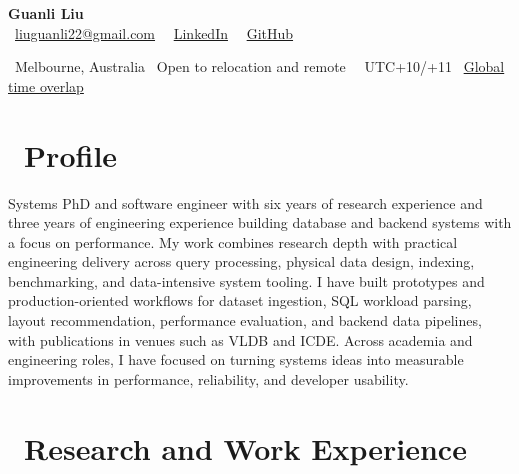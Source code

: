 \documentclass{resume}
\begin{document}

{\LARGE \textbf{Guanli Liu}}\\[-0.2em]
\faEnvelope\ \href{mailto:liuguanli22@gmail.com}{liuguanli22@gmail.com} 
\textperiodcentered\ 
\faLinkedin\ \href{https://www.linkedin.com/in/guanli-liu-11353058/}{LinkedIn} \textperiodcentered\ 
\faGithub\ \href{https://github.com/Liuguanli}{GitHub}

\faMapMarker\ Melbourne, Australia \textperiodcentered\ Open to relocation and remote \textperiodcentered\ 
\faClockO\  UTC+10/+11 \textperiodcentered\ 
\href{https://www.worldtimebuddy.com/?lid=5808079,5128581,5809844,1816670,2158177&h=2158177&hf=1}{Global time overlap \faExternalLink}
\vspace{0.4em}



\section{\faUser\ \textbf{Profile}}
Systems PhD and software engineer with six years of research experience and three years of engineering experience building database and backend systems with a focus on performance. My work combines research depth with practical engineering delivery across query processing, physical data design, indexing, benchmarking, and data-intensive system tooling. I have built prototypes and production-oriented workflows for dataset ingestion, SQL workload parsing, layout recommendation, performance evaluation, and backend data pipelines, with publications in venues such as VLDB and ICDE. Across academia and engineering roles, I have focused on turning systems ideas into measurable improvements in performance, reliability, and developer usability.



\section{\faUsers\ \textbf{Research and Work Experience}}
\end{document}
